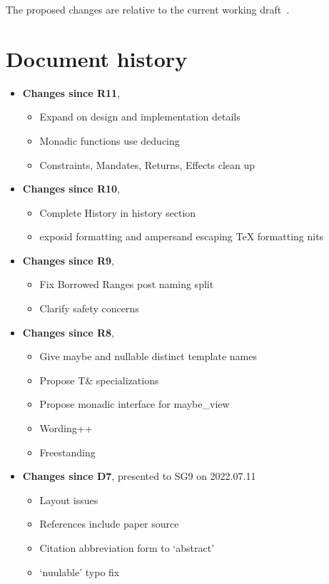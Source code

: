\documentclass[a4paper,10pt,oneside,openany,final,article]{memoir}
\begin{document}
The proposed changes are relative to the current working draft~\cite{N4958}.

\chapter*{Document history}

\begin{itemize}
\item \textbf{Changes since R11},
  \begin{itemize}
  \item Expand on design and implementation details
  \item Monadic functions use deducing 
  \item Constraints, Mandates, Returns, Effects clean up
  \end{itemize}
\item \textbf{Changes since R10},
  \begin{itemize}
  \item Complete History in history section
  \item exposid formatting and ampersand escaping TeX formatting nits
  \end{itemize}
\item \textbf{Changes since R9},
  \begin{itemize}
  \item Fix Borrowed Ranges post naming split
  \item Clarify safety concerns
  \end{itemize}
\item \textbf{Changes since R8},
  \begin{itemize}
  \item Give maybe and nullable distinct template names
  \item Propose T\& specializations
  \item Propose monadic interface for maybe_view
  \item Wording++
  \item Freestanding
  \end{itemize}
\item \textbf{Changes since D7}, presented to SG9 on 2022.07.11
  \begin{itemize}
  \item Layout issues
  \item References include paper source
  \item Citation abbreviation form to `abstract'
  \item `nuulable' typo fix

\end{itemize}
\end{itemize}
\end{document}
